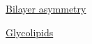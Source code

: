 \documentclass[12pt,letterpaper]{article}
\begin{document}
\hypertarget{10.6}{}
\begin{secbox}{\hyperlink{10}{Bilayer asymmetry}}{

}\end{secbox}
\hypertarget{10.7}{}
\begin{secbox}{\hyperlink{10}{Glycolipids}}{

}\end{secbox}
\end{document}
